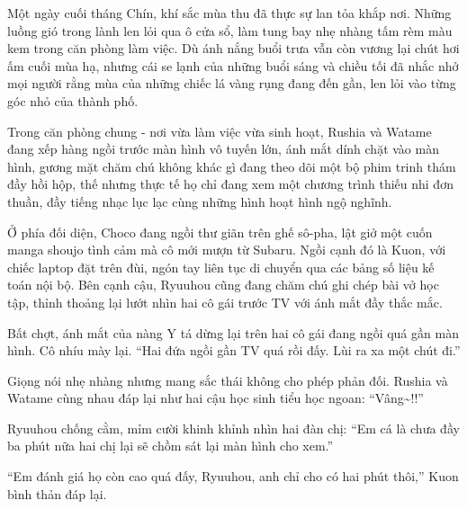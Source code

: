 \documentclass[../main.tex]{subfiles}
\begin{document}

Một ngày cuối tháng Chín, khí sắc mùa thu đã thực sự lan tỏa khắp nơi. Những luồng gió trong lành len lỏi qua ô cửa sổ, làm tung bay nhẹ nhàng tấm rèm màu kem trong căn phòng làm việc. Dù ánh nắng buổi trưa vẫn còn vương lại chút hơi ấm cuối mùa hạ, nhưng cái se lạnh của những buổi sáng và chiều tối đã nhắc nhở mọi người rằng mùa của những chiếc lá vàng rụng đang đến gần, len lỏi vào từng góc nhỏ của thành phố.

Trong căn phòng chung - nơi vừa làm việc vừa sinh hoạt, Rushia và Watame đang xếp hàng ngồi trước màn hình vô tuyến lớn, ánh mắt dính chặt vào màn hình, gương mặt chăm chú không khác gì đang theo dõi một bộ phim trinh thám đầy hồi hộp, thế nhưng thực tế họ chỉ đang xem một chương trình thiếu nhi đơn thuần, đầy tiếng nhạc lục lạc cùng những hình hoạt hình ngộ nghĩnh.

Ở phía đối diện, Choco đang ngồi thư giãn trên ghế sô-pha, lật giở một cuốn manga shoujo tình cảm mà cô mới mượn từ Subaru. Ngồi cạnh đó là Kuon, với chiếc laptop đặt trên đùi, ngón tay liên tục di chuyển qua các bảng số liệu kế toán nội bộ. Bên cạnh cậu, Ryuuhou cũng đang chăm chú ghi chép bài vở học tập, thỉnh thoảng lại lướt nhìn hai cô gái trước TV với ánh mắt đầy thắc mắc.

Bất chợt, ánh mắt của nàng Y tá dừng lại trên hai cô gái đang ngồi quá gần màn hình. Cô nhíu mày lại. ``Hai đứa ngồi gần TV quá rồi đấy. Lùi ra xa một chút đi.''

Giọng nói nhẹ nhàng nhưng mang sắc thái không cho phép phản đối. Rushia và Watame cùng nhau đáp lại như hai cậu học sinh tiểu học ngoan: ``Vâng\~{}!!''

Ryuuhou chống cằm, mỉm cười khinh khỉnh nhìn hai đàn chị: ``Em cá là chưa đầy ba phút nữa hai chị lại sẽ chồm sát lại màn hình cho xem.''

``Em đánh giá họ còn cao quá đấy, Ryuuhou, anh chỉ cho có hai phút thôi,'' Kuon bình thản đáp lại.
\end{document}
